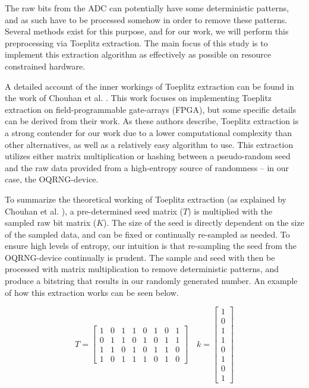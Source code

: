 \documentclass{sigchi}
\begin{document}
The raw bits from the ADC can potentially have some deterministic patterns, and as such have to be processed somehow in order to remove these patterns. Several methods exist for this purpose, and for our work, we will perform this preprocessing via Toeplitz extraction. The main focus of this study is to implement this extraction algorithm as effectively as possible on resource constrained hardware.

A detailed account of the inner workings of Toeplitz extraction can be found in the work of Chouhan et al. \cite{toeplitz-desc}. This work focuses on implementing Toeplitz extraction on field-programmable gate-arrays (FPGA), but some specific details can be derived from their work. As these authors describe, Toeplitz extraction is a strong contender for our work due to a lower computational complexity than other alternatives, as well as a relatively easy algorithm to use. This extraction utilizes either matrix multiplication or hashing between a pseudo-random seed and the raw data provided from a high-entropy source of randomness -- in our case, the OQRNG-device.

To summarize the theoretical working of Toeplitz extraction (as explained by Chouhan et al. \cite{toeplitz-desc}), a pre-determined seed matrix (\(T\)) is multiplied with the sampled raw bit matrix (\(K\)). The size of the seed is directly dependent on the size of the sampled data, and can be fixed or continually re-sampled as needed. To ensure high levels of entropy, our intuition is that re-sampling the seed from the OQRNG-device continually is prudent. The sample and seed with then be processed with matrix multiplication to remove deterministic patterns, and produce a bitstring that results in our randomly generated number. An example of how this extraction works can be seen below.

\[
T =
\begin{bmatrix}
1 & 0 & 1 & 1 & 0 & 1 & 0 & 1 \\
0 & 1 & 1 & 0 & 1 & 0 & 1 & 1 \\
1 & 1 & 0 & 1 & 0 & 1 & 1 & 0 \\
1 & 0 & 1 & 1 & 1 & 0 & 1 & 0
\end{bmatrix}
\quad
k =
\begin{bmatrix}
1 \\ 0 \\ 1 \\ 1 \\ 0 \\ 1 \\ 0 \\ 1
\end{bmatrix}
\]
\end{document}
